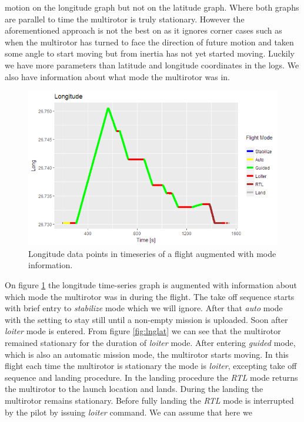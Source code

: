 \documentclass[12pt,oneside]{reedthesis}
\theoremstyle{definition}
\theoremstyle{definition}
\theoremstyle{definition}
\theoremstyle{remark}
\begin{document}
motion on the longitude graph but not on the latitude graph. Where both
graphs are parallel to time the multirotor is truly stationary. However
the aforementioned approach is not the best on as it ignores corner
cases such as when the multirotor has turned to face the direction of
future motion and taken some angle to start moving but from inertia has
not yet started moving. Luckily we have more parameters than latitude
and longitude coordinates in the logs. We also have information about
what mode the multirotor was in.
\begin{figure}
\centering
\includegraphics{./figure/longWithMode.PNG}
\caption{\label{fig:lngmode}Longitude data points in timeseries of a flight
augmented with mode information.}
\end{figure}
On figure \ref{fig:lngmode} the longitude time-series graph is augmented
with information about which mode the multirotor was in during the
flight. The take off sequence starts with brief entry to
\emph{stabilize} mode which we will ignore. After that \emph{auto} mode
with the setting to stay still until a non-empty mission is uploaded.
Soon after \emph{loiter} mode is entered. From figure \ref{fig:lnglat}
we can see that the multirotor remained stationary for the duration of
\emph{loiter} mode. After entering \emph{guided} mode, which is also an
automatic mission mode, the multirotor starts moving. In this flight
each time the multirotor is stationary the mode is \emph{loiter},
excepting take off sequence and landing procedure. In the landing
procedure the \emph{RTL} mode returns the multirotor to the launch
location and lands. During the landing the multirotor remains
stationary. Before fully landing the \emph{RTL} mode is interrupted by
the pilot by issuing \emph{loiter} command. We can assume that here we
\end{document}
